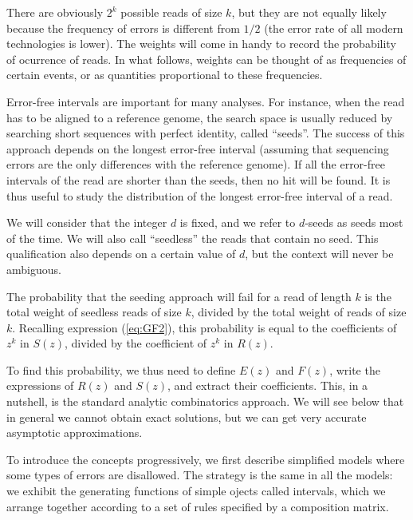 \documentclass{article}
\begin{document}
There are obviously $2^k$ possible reads of size $k$, but they are not
equally likely because the frequency of errors is different from $1/2$
(the error rate of all modern technologies is lower). The weights will
come in handy to record the probability of ocurrence of reads. In what
follows, weights can be thought of as frequencies of certain events, or as
quantities proportional to these frequencies.

Error-free intervals are important for many analyses. For instance, when
the read has to be aligned to a reference genome, the search space is
usually reduced by searching short sequences with perfect identity, called
``seeds''. The success of this approach depends on the longest error-free
interval (assuming that sequencing errors are the only differences with
the reference genome). If all the error-free intervals of the read are
shorter than the seeds, then no hit will be found. It is thus useful to
study the distribution of the longest error-free interval of a read.

We will consider that the integer $d$ is fixed, and we refer to $d$-seeds
as seeds most of the time. We will also call ``seedless'' the reads that
contain no seed. This qualification also depends on a certain value of
$d$, but the context will never be ambiguous.

The probability that the seeding approach will fail for a read of length
$k$ is the total weight of seedless reads of size $k$, divided by the
total weight of reads of size $k$. Recalling expression (\ref{eq:GF2}),
this probability is equal to the coefficients of $z^k$ in $S(z)$, divided
by the coefficient of $z^k$ in $R(z)$.

To find this probability, we thus need to define $E(z)$ and $F(z)$, write
the expressions of $R(z)$ and $S(z)$, and extract their coefficients.
This, in a nutshell, is the standard analytic combinatorics approach. We
will see below that in general we cannot obtain exact solutions, but we
can get very accurate asymptotic approximations.

To introduce the concepts progressively, we first describe simplified
models where some types of errors are disallowed. The strategy is the same
in all the models: we exhibit the generating functions of simple ojects
called intervals, which we arrange together according to a set of rules
specified by a composition matrix.





\end{document}
